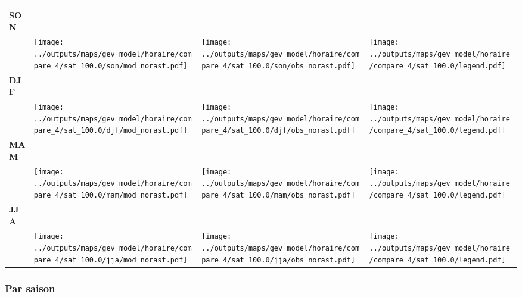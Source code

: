 \documentclass[
  letterpaper,
  DIV=11,
  numbers=noendperiod]{scrartcl}
\begin{document}
\begin{longtable*}{m{2.0cm}m{7.9cm}m{7.9cm}m{1cm}}
 & \centering  & \centering  & \tabularnewline
\centering \textbf{SON} \\[0.2em] \begin{tabular}{r@{\hspace{0.2em}}l}\end{tabular} & \centering \texttt{[image: ../outputs/maps/gev\_model/horaire/compare\_4/sat\_100.0/son/mod\_norast.pdf]} & \centering \texttt{[image: ../outputs/maps/gev\_model/horaire/compare\_4/sat\_100.0/son/obs\_norast.pdf]} & \centering \texttt{[image: ../outputs/maps/gev\_model/horaire/compare\_4/sat\_100.0/legend.pdf]} \tabularnewline
\centering \textbf{DJF} \\[0.2em] \begin{tabular}{r@{\hspace{0.2em}}l}\end{tabular} & \centering \texttt{[image: ../outputs/maps/gev\_model/horaire/compare\_4/sat\_100.0/djf/mod\_norast.pdf]} & \centering \texttt{[image: ../outputs/maps/gev\_model/horaire/compare\_4/sat\_100.0/djf/obs\_norast.pdf]} & \centering \texttt{[image: ../outputs/maps/gev\_model/horaire/compare\_4/sat\_100.0/legend.pdf]} \tabularnewline
\centering \textbf{MAM} \\[0.2em] \begin{tabular}{r@{\hspace{0.2em}}l}\end{tabular} & \centering \texttt{[image: ../outputs/maps/gev\_model/horaire/compare\_4/sat\_100.0/mam/mod\_norast.pdf]} & \centering \texttt{[image: ../outputs/maps/gev\_model/horaire/compare\_4/sat\_100.0/mam/obs\_norast.pdf]} & \centering \texttt{[image: ../outputs/maps/gev\_model/horaire/compare\_4/sat\_100.0/legend.pdf]} \tabularnewline
\centering \textbf{JJA} \\[0.2em] \begin{tabular}{r@{\hspace{0.2em}}l}\end{tabular} & \centering \texttt{[image: ../outputs/maps/gev\_model/horaire/compare\_4/sat\_100.0/jja/mod\_norast.pdf]} & \centering \texttt{[image: ../outputs/maps/gev\_model/horaire/compare\_4/sat\_100.0/jja/obs\_norast.pdf]} & \centering \texttt{[image: ../outputs/maps/gev\_model/horaire/compare\_4/sat\_100.0/legend.pdf]} \tabularnewline
\end{longtable*}

\subsubsection{Par saison}\label{par-saison-10}
\end{document}
